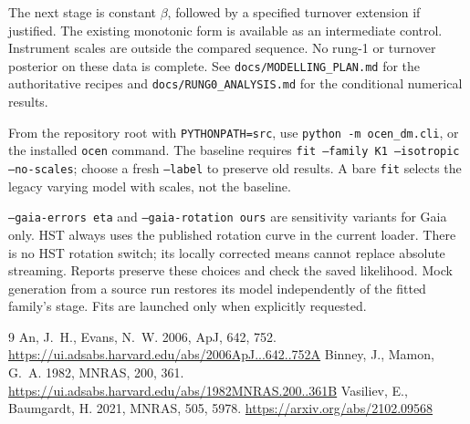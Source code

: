 \documentclass[11pt,a4paper]{article}
\begin{document}
The next stage is constant $\beta$, followed by a specified turnover extension if justified.
The existing monotonic form is available as an intermediate control. Instrument scales are
outside the compared sequence. No rung-1 or turnover posterior on these data is complete.
See \texttt{docs/MODELLING\_PLAN.md} for the authoritative recipes and
\texttt{docs/RUNG0\_ANALYSIS.md} for the conditional numerical results.

From the repository root with \texttt{PYTHONPATH=src}, use
\texttt{python -m ocen\_dm.cli}, or the installed \texttt{ocen} command. The baseline
requires \texttt{fit --family K1 --isotropic --no-scales}; choose a fresh
\texttt{--label} to preserve old results. A bare \texttt{fit} selects the legacy varying
model with scales, not the baseline.

\texttt{--gaia-errors eta} and \texttt{--gaia-rotation ours} are sensitivity variants for
Gaia only. HST always uses the published rotation curve in the current loader. There is
no HST rotation switch; its locally corrected means cannot replace absolute streaming.
Reports preserve these choices and check the saved likelihood. Mock generation from a
source run restores its model independently of the fitted family's stage. Fits are
launched only when explicitly requested.

\begin{thebibliography}{9}
 An, J.~H., Evans, N.~W. 2006, ApJ, 642, 752.
  \url{https://ui.adsabs.harvard.edu/abs/2006ApJ...642..752A}
 Binney, J., Mamon, G.~A. 1982, MNRAS, 200,
  361. \url{https://ui.adsabs.harvard.edu/abs/1982MNRAS.200..361B}
 Vasiliev, E., Baumgardt, H. 2021, MNRAS,
  505, 5978. \url{https://arxiv.org/abs/2102.09568}
\end{thebibliography}
\end{document}
